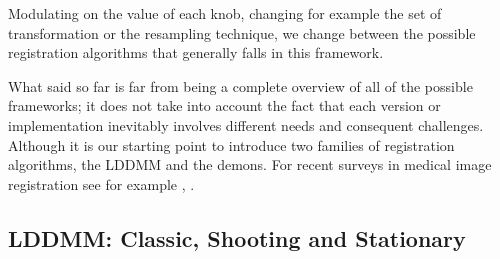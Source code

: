 \noindent
Modulating on the value of each knob, changing for example the set of transformation or the resampling technique, we change between the possible registration algorithms that generally falls in this framework.

What said so far is far from being a complete overview of all of the possible frameworks; it does not take into account the fact that each version or implementation inevitably involves different needs and consequent challenges. Although it is our starting point to introduce two families of registration algorithms, the LDDMM and the demons.
For recent surveys in medical image registration see for example \cite{Sotiras:survey:13}, \cite{zitova2003image} . 

\subsection{LDDMM: Classic, Shooting and Stationary}\label{se:intro_lddmm}

